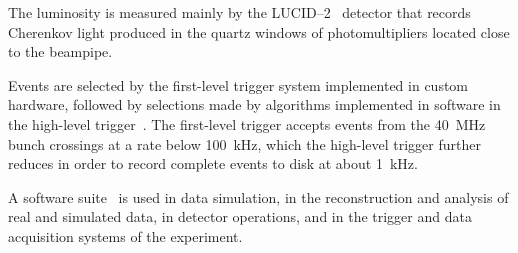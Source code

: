 The luminosity is measured mainly by the LUCID--2~\cite{LUCID2} detector that records Cherenkov light produced in the quartz windows of photomultipliers located close to the beampipe.

Events are selected by the first-level trigger system implemented in custom hardware,
followed by selections made by algorithms implemented in software in the high-level trigger~\cite{TRIG-2016-01}. 
The first-level trigger accepts events from the \qty{40}{\MHz} bunch crossings at a rate below \qty{100}{\kHz},
which the high-level trigger further reduces in order to record complete events to disk at about \qty{1}{\kHz}.

A software suite~\cite{ATL-SOFT-PUB-2021-001} is used in data simulation, in the reconstruction
and analysis of real and simulated data, in detector operations, and in the trigger and data acquisition
systems of the experiment.

